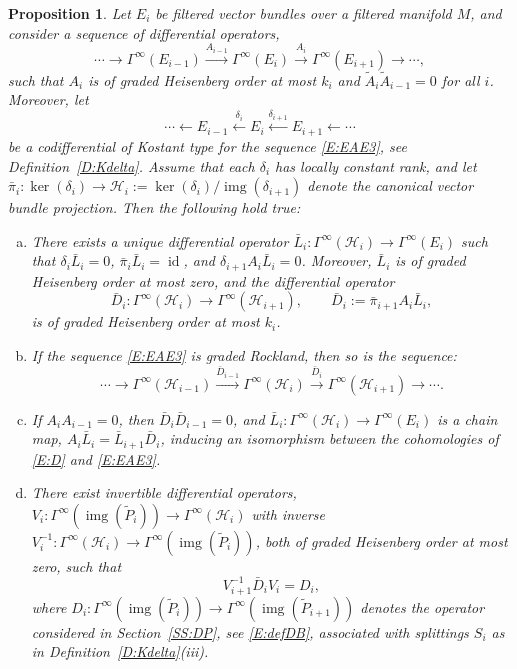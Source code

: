 \documentclass[reqno,12pt]{amsart}
\DeclareMathOperator{\img}{img}
\DeclareMathOperator{\id}{id}
\theoremstyle{plain}
\newtheorem{proposition}[theorem]{Proposition}
\theoremstyle{definition}
\begin{document}
\begin{proposition}\label{P:D}
Let $E_i$ be filtered vector bundles over a filtered manifold $M$, and consider a sequence of differential operators,
\begin{equation}\label{E:EAE3}
\cdots\to\Gamma^\infty(E_{i-1})\xrightarrow{A_{i-1}}\Gamma^\infty(E_i)\xrightarrow{A_i}\Gamma^\infty(E_{i+1})\to\cdots,
\end{equation}
such that $A_i$ is of graded Heisenberg order at most $k_i$ and $\tilde A_i\tilde A_{i-1}=0$ for all $i$.
Moreover, let 
$$
\cdots\leftarrow E_{i-1}\xleftarrow{\delta_i}E_i\xleftarrow{\delta_{i+1}}E_{i+1}\leftarrow\cdots
$$
be a codifferential of Kostant type for the sequence \eqref{E:EAE3}, see Definition~\ref{D:Kdelta}.
Assume that each $\delta_i$ has locally constant rank, and let $\bar\pi_i\colon\ker(\delta_i)\to\mathcal H_i:=\ker(\delta_i)/\img(\delta_{i+1})$ denote the canonical vector bundle projection.
Then the following hold true:

\begin{enumerate}[(a)]
\item
There exists a unique differential operator $\bar L_i\colon\Gamma^\infty(\mathcal H_i)\to\Gamma^\infty(E_i)$ such that $\delta_i\bar L_i=0$, $\bar\pi_i\bar L_i=\id$, and $\delta_{i+1}A_i\bar L_i=0$.
Moreover, $\bar L_i$ is of graded Heisenberg order at most zero, and the differential operator 
\begin{equation}\label{E:defbarD}
\bar D_i\colon\Gamma^\infty(\mathcal H_i)\to\Gamma^\infty(\mathcal H_{i+1}),\qquad\bar D_i:=\bar\pi_{i+1}A_i\bar L_i,
\end{equation}
is of graded Heisenberg order at most $k_i$.


\item
If the sequence \eqref{E:EAE3} is graded Rockland, then so is the sequence:
\begin{equation}\label{E:D}
\cdots\to\Gamma^\infty(\mathcal H_{i-1})\xrightarrow{\bar D_{i-1}}\Gamma^\infty(\mathcal H_i)\xrightarrow{\bar D_i}\Gamma^\infty(\mathcal H_{i+1})\to\cdots.
\end{equation}

\item
If $A_iA_{i-1}=0$, then $\bar D_i\bar D_{i-1}=0$, and $\bar L_i\colon\Gamma^\infty(\mathcal H_i)\to\Gamma^\infty(E_i)$ is a chain map, $A_i\bar L_i=\bar L_{i+1}\bar D_i$, inducing an isomorphism between the cohomologies of \eqref{E:D} and \eqref{E:EAE3}.

\item
There exist invertible differential operators, $V_i\colon\Gamma^\infty(\img(\tilde P_i))\to\Gamma^\infty(\mathcal H_i)$ with inverse $V_i^{-1}\colon\Gamma^\infty(\mathcal H_i)\to\Gamma^\infty(\img(\tilde P_i))$, both of graded Heisenberg order at most zero, such that 
$$
V_{i+1}^{-1}\bar D_iV_i=D_i,
$$
where $D_i\colon\Gamma^\infty(\img(\tilde P_i))\to\Gamma^\infty(\img(\tilde P_{i+1}))$ denotes the operator considered in Section~\ref{SS:DP}, see \eqref{E:defDB}, associated with splittings $S_i$ as in Definition~\ref{D:Kdelta}(iii).
\end{enumerate}
\end{proposition}
\end{document}
